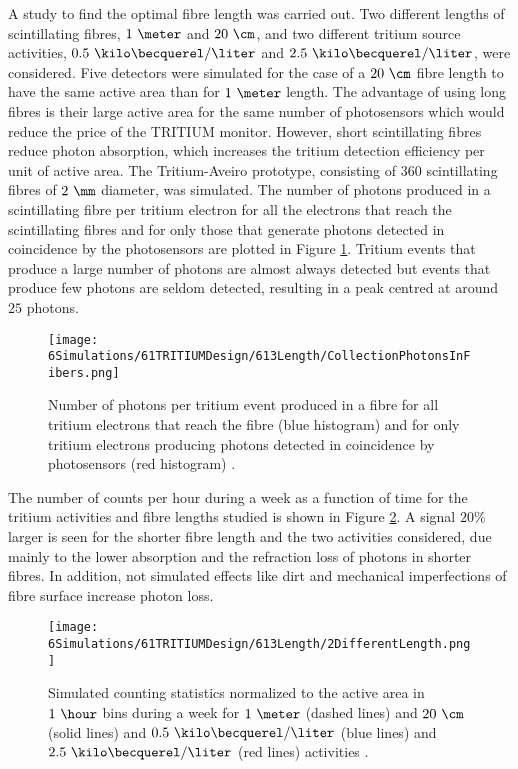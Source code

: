 A study to find the optimal fibre length was carried out. Two different lengths of scintillating fibres, $1~\meter$ and $20~\cm$, and two different tritium source activities, $0.5~\kilo\becquerel/\liter$ and $2.5~\kilo\becquerel/\liter$, were considered. Five detectors were simulated for the case of a $20~\cm$ fibre length to have the same active area than for $1~\meter$ length. The advantage of using long fibres is their large active area for the same number of photosensors which would reduce the price of the TRITIUM monitor. However, short scintillating fibres reduce photon absorption, which increases the tritium detection efficiency per unit of active area. The Tritium-Aveiro prototype, consisting of $360$ scintillating fibres of $2~\mm$ diameter, was simulated. The number of photons produced in a scintillating fibre per tritium electron for all the electrons that reach the scintillating fibres and for only those that generate photons detected in coincidence by the photosensors are plotted in Figure \ref{fig:PhotonsFibersYesNoPhotosensors}. Tritium events that produce a large number of photons are almost always detected but events that produce few photons are seldom detected, resulting in a peak centred at around $25$ photons.  
\begin{figure}[h]
\centering
\texttt{[image: 6Simulations/61TRITIUMDesign/613Length/CollectionPhotonsInFibers.png]}
\caption{Number of photons per tritium event produced in a fibre for all tritium electrons that reach the fibre (blue histogram) and for only tritium electrons producing photons detected in coincidence by photosensors (red histogram) \cite{SimulationPaperCarlos}.\label{fig:PhotonsFibersYesNoPhotosensors}}
\end{figure}
The number of counts per hour during a week as a function of time for the tritium activities and fibre lengths studied is shown in Figure \ref{fig:CountsOver60minDifferentLength}. A signal $20\%$ larger is seen for the shorter fibre length and the two activities considered, due mainly to the lower absorption and the refraction loss of photons in shorter fibres. In addition, not simulated effects like dirt and mechanical imperfections of fibre surface increase photon loss.

\begin{figure}[h]
\centering
\texttt{[image: 6Simulations/61TRITIUMDesign/613Length/2DifferentLength.png]}
\caption{Simulated counting statistics normalized to the active area in $1~\hour$ bins during a week for $1~\meter$ (dashed lines) and $20~\cm$ (solid lines) and $0.5~\kilo\becquerel/\liter$ (blue lines) and $2.5~\kilo\becquerel/\liter$ (red lines) activities \cite{SimulationPaperCarlos}. \label{fig:CountsOver60minDifferentLength}}
\end{figure}

